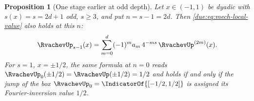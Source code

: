 \documentclass[11pt,oneside]{article}
\theoremstyle{plain}
\newtheorem{proposition}[theorem]{Proposition}
\theoremstyle{definition}
\theoremstyle{remark}
\newcommand{\upn}[1]{\RvachevUp_{#1}}
\newcommand{\dep}[1]{s\!\left(#1\right)}                    %
\newcommand{\am}[1]{a_{#1}}                                 %
\begin{document}
\begin{proposition}[One stage earlier at odd depth]
\label{due:prop:mech-odd-onset}
Let \(x\in(-1,1)\) be dyadic with \(\dep{x}=s=2d+1\) odd, \(s\ge3\), and put
\(n=s-1=2d\).  Then \cref{due:eq:mech-local-value} also holds at this
\(n\):
\begin{equation}
 \upn{s-1}(x)=\sum_{m=0}^{d}(-1)^{m}\am{m}\,4^{-ms}\,\RvachevUp^{(2m)}(x).
 \label{due:eq:mech-odd-onset}
\end{equation}
For \(s=1\), \(x=\pm1/2\), the same formula at \(n=0\) reads
\(\upn{0}(\pm1/2)=\RvachevUp(\pm1/2)=1/2\) and holds if and only if the jump
of the box \(\upn{0}=\IndicatorOf{[-1/2,1/2]}\) is assigned its Fourier-inversion
value \(1/2\).
\end{proposition}
\end{document}
